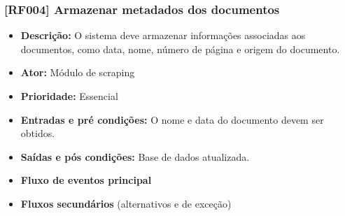 \subsubsection{[RF004] Armazenar metadados dos documentos}
\begin{itemize}
   \item \textbf{Descrição:} O sistema deve armazenar informações associadas aos documentos, como data, nome, número de página e origem do documento.
   \item \textbf{Ator:} Módulo de scraping
   \item \textbf{Prioridade:} Essencial
   \item \textbf{Entradas e pré condições:} O nome e data do documento devem ser obtidos.
   \item \textbf{Saídas e pós condições:} Base de dados atualizada.
   \item \textbf{Fluxo de eventos principal}
   \item \textbf{Fluxos secundários} (alternativos e de exceção)
 \end{itemize}

